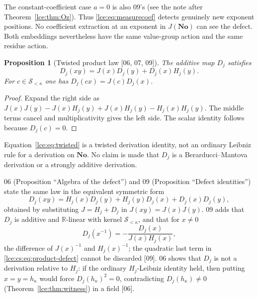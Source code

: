 \documentclass[11pt,letterpaper]{article}
\numberwithin{equation}{section}
\newtheorem{proposition}[theorem]{Proposition}
\theoremstyle{definition}
\theoremstyle{remark}
\newcommand{\No}{\mathbf{No}}
\newcommand{\R}{\mathbb R}
\newcommand{\Sk}{\mathscr S_{<\kappa}}
\newcommand{\thref}[1]{Theorem~\ref{#1}}
\newcommand{\src}[1]{\textup{\textsf{\small[#1]}}}%
\begin{document}
The constant-coefficient case $a=0$ is also 09's (see the note after
\thref{lce:thm:Oz}).
Thus \eqref{lce:eq:measurecoef} detects genuinely new exponent positions. No
coefficient extraction at an exponent in $J(\No)$ can see the defect.
Both embeddings nevertheless have the same value-group action and the
same residue action.

\begin{proposition}[Twisted product law \src{06, 07, 09}]\label{lce:prop:twisted}
The additive map $D_j$ satisfies
\begin{equation}\label{lce:eq:twisted}
 D_j(xy)=J(x)D_j(y)+D_j(x)H_j(y).
\end{equation}
For $c\in\Sk$ one has $D_j(cx)=J(c)D_j(x)$.
\end{proposition}
\begin{proof}
Expand the right side as
$J(x)J(y)-J(x)H_j(y)+J(x)H_j(y)-H_j(x)H_j(y)$.
The middle terms cancel and multiplicativity gives the left side.
The scalar identity follows because $D_j(c)=0$.
\end{proof}

Equation~\eqref{lce:eq:twisted} is a twisted derivation identity, not an
ordinary Leibniz rule for a derivation on $\No$. No claim is made that
$D_j$ is a Berarducci--Mantova derivation or a strongly additive derivation.

06 (Proposition ``Algebra of the defect'') and 09 (Proposition ``Defect
identities'') state the same law in the equivalent symmetric form
\begin{equation}\label{lce:cs:eq:product-defect}
 D_j(xy)=H_j(x)D_j(y)+H_j(y)D_j(x)+D_j(x)D_j(y),
\end{equation}
obtained by substituting $J=H_j+D_j$ in $J(xy)=J(x)J(y)$. 09 adds that $D_j$
is additive and $\R$-linear with kernel $\Sk$, and that for $x\ne0$
\[
 D_j(x^{-1})=-\frac{D_j(x)}{J(x)H_j(x)},
\]
the difference of $J(x)^{-1}$ and $H_j(x)^{-1}$; the quadratic last term in
\eqref{lce:cs:eq:product-defect} cannot be discarded \src{09}. 06 shows that
$D_j$ is not a derivation relative to $H_j$: if the ordinary $H_j$-Leibniz
identity held, then putting $x=y=h_\kappa$ would force
$D_j(h_\kappa)^2=0$, contradicting $D_j(h_\kappa)\ne0$
(\thref{lce:thm:witness}) in a field \src{06}.
\end{document}
